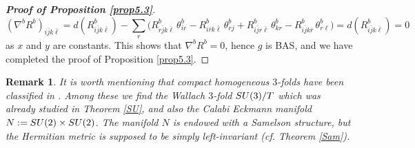 \documentclass{amsart}
\numberwithin{equation}{section}
\newtheorem{remark}  [theorem]     {Remark}
\theoremstyle{definition}
\renewcommand{\1}{\mathds{1}}
\newcommand{\SU}{\rm {SU}}
\newcommand{\T}{\rm{T}}
\renewcommand{\>}{\rightarrow}
\begin{document}
\begin{proof}[{\bf Proof of Proposition \ref{prop5.3}}]
$$ (\nabla^bR^b)_{i\bar{j}k\bar{\ell}} = d (R^b_{i\bar{j}k\bar{\ell}} ) - \sum_r \big( R^b_{r\bar{j}k\bar{\ell}} \,\theta^b_{ir} - R^b_{i\bar{r}k\bar{\ell}} \,\theta^b_{rj} + R^b_{i\bar{j}r\bar{\ell}} \,\theta^b_{kr} - R^b_{i\bar{j}k\bar{r}} \,\theta^b_{r\ell} \big) = d (R^b_{i\bar{j}k\bar{\ell}} ) = 0 $$
as $x$ and $y$ are constants. This shows that $\nabla^bR^b=0$, hence $g$ is {\rm BAS}, and we have completed the proof of Proposition \ref{prop5.3}.
\end{proof}
\begin{remark} It is worth mentioning that compact homogeneous $3$-folds have been classified in \cite{T}. Among these we find the Wallach $3$-fold $\SU(3)/\T$ which was already studied in Theorem \ref{SU}, and also the Calabi Eckmann manifold $N:= \SU(2)\times\SU(2)$. The manifold $N$ is endowed with a Samelson structure, but the Hermitian metric is supposed to be simply left-invariant (cf. Theorem \ref{Sam}).  \end{remark}
\end{document}
